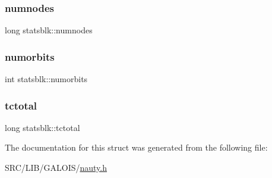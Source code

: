 \subsubsection{\texorpdfstring{numnodes}{numnodes}}
{\footnotesize\ttfamily long statsblk\+::numnodes}

\mbox{\label{structstatsblk_afc318992d3550eca8a81d77443346b0a}} 
\subsubsection{\texorpdfstring{numorbits}{numorbits}}
{\footnotesize\ttfamily int statsblk\+::numorbits}

\mbox{\label{structstatsblk_a05839dbfbfd5887c2498d46d39586bf4}} 
\subsubsection{\texorpdfstring{tctotal}{tctotal}}
{\footnotesize\ttfamily long statsblk\+::tctotal}



The documentation for this struct was generated from the following file\+:\begin{DoxyCompactItemize}
\item 
S\+R\+C/\+L\+I\+B/\+G\+A\+L\+O\+I\+S/\mbox{\hyperlink{nauty_8h}{nauty.\+h}}\end{DoxyCompactItemize}
